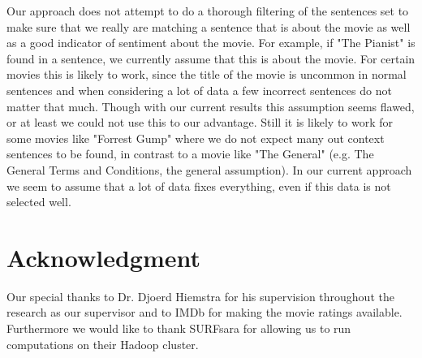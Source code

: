 \documentclass{sig-alternate-br}
\begin{document}
Our approach does not attempt to do a thorough filtering of the sentences set to make sure that we really are matching a sentence that is about the movie as well as a good indicator of sentiment about the movie. For example, if "The Pianist" is found in a sentence, we currently assume that this is about the movie. For certain movies this is likely to work, since the title of the movie is uncommon in normal sentences and when considering a lot of data a few incorrect sentences do not matter that much. Though with our current results this assumption seems flawed, or at least we could not use this to our advantage. Still it is likely to work for some movies like "Forrest Gump" where we do not expect many out context sentences to be found, in contrast to a movie like "The General" (e.g. The General Terms and Conditions, the general assumption). In our current approach we seem to assume that a lot of data fixes everything, even if this data is not selected well.

\section{Acknowledgment}
Our special thanks to Dr. Djoerd Hiemstra for his supervision throughout the research as our supervisor and to IMDb for making the movie ratings available. Furthermore we would like to thank SURFsara for allowing us to run computations on their Hadoop cluster.
%




\balancecolumns

\onecolumn
\end{document}
